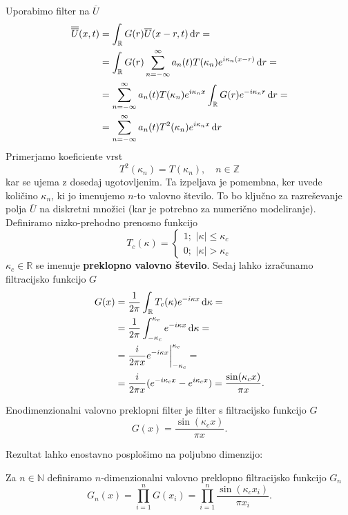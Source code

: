 \documentclass[mat2, tisk]{fmfdelo}
\newcommand{\R}{\mathbb R}
\newcommand{\N}{\mathbb N}
\newcommand{\Z}{\mathbb Z}
\begin{document}
\noindent
Uporabimo filter na $\overline{U}$
\begin{align*}
\overline{\overline{U}}(x, t) &= \int_\R G(r) \overline{U}(x-r, t) \dif r = \\
&= \int_\R G(r) \sum_{n=-\infty}^\infty a_n(t) T(\kappa_n) e^{i\kappa_n (x - r)} \dif r= \\
&= \sum_{n=-\infty}^\infty a_n(t)T(\kappa_n) e^{i\kappa_n x} \int_\R G(r)e^{-i\kappa_n r} \dif r = \\
&= \sum_{n=-\infty}^\infty a_n(t)T^2(\kappa_n) e^{i\kappa_n x} \dif r
\end{align*}
Primerjamo koeficiente vrst
$$
T^2(\kappa_n) = T(\kappa_n), \quad n\in \Z
$$
kar se ujema z dosedaj ugotovljenim. Ta izpeljava je pomembna, ker uvede količino 
$\kappa_n$, ki jo imenujemo $n$-to valovno število. To bo ključno za razreševanje 
polja $\overline{U}$ na diskretni množici (kar je potrebno za numerično modeliranje).
Definiramo nizko-prehodno prenosno funkcijo
$$
T_c(\kappa)=\left\{\begin{array}{l}
  1 ;\,\, |\kappa| \leq \kappa_c \\
  0 ;\,\, |\kappa| > \kappa_c
\end{array}\right.
$$
$\kappa_c \in \R$ se imenuje \textbf{preklopno valovno število}. Sedaj lahko izračunamo 
filtracijsko funkcijo $G$
\begin{align*}
G(x) &= \frac{1}{2\pi} \int_\R T_c(\kappa) e^{-i\kappa x} \dif \kappa = \\
&= \frac{1}{2\pi} \int_{-\kappa_c}^{\kappa_c} e^{-i\kappa x} \dif \kappa = \\ 
&= \frac{i}{2\pi x} e^{-i\kappa x}\Big|_{-\kappa_c}^{\kappa_c} = \\
&= \frac{i}{2\pi x} (e^{-i\kappa_c x} - e^{i\kappa_c x}) = \frac{\sin(\kappa_c x)}{\pi x}.
\end{align*} 

\begin{definicija}
Enodimenzionalni valovno preklopni filter je filter s filtracijsko funkcijo $G$
\begin{equation}
G(x) = \frac{\sin(\kappa_c x)}{\pi x}.
\end{equation}
\end{definicija}
\noindent
Rezultat lahko enostavno posplošimo na poljubno dimenzijo:
\begin{definicija}
Za $n\in \N$ definiramo $n$-dimenzionalni valovno preklopno filtracijsko 
funkcijo $G_n$
\begin{equation}
G_n(x) = \prod_{i=1}^n G(x_i) =\prod_{i=1}^n \frac{\sin(\kappa_c x_i)}{\pi x_i}.
\end{equation} 
\end{definicija}
\end{document}
